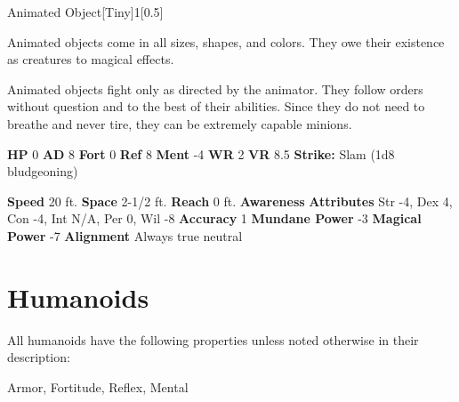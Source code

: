   
  \begin{monsection}{Animated Object}[Tiny]{1}[0.5]
    \vspace{-1em}\vspace{-1em}
    \vspace{0em}

    
    Animated objects come in all sizes, shapes, and colors. They owe their existence as creatures to magical effects.

    Animated objects fight only as directed by the animator. They follow orders without question and to the best of their abilities. Since they do not need to breathe and never tire, they can be extremely capable minions.
  
    

    \begin{spellcontent}
      \begin{spelltargetinginfo}
        \pari \textbf{HP} 0 \monsep
          \textbf{AD} 8 \monsep
          \textbf{Fort} 0 \monsep
          \textbf{Ref} 8 \monsep
          \textbf{Ment} -4
        \pari \textbf{WR} 2 \monsep
        \textbf{VR} 8.5
        \pari \textbf{Strike:}
            Slam  (1d8 bludgeoning)
      \end{spelltargetinginfo}
    \end{spellcontent}
    \begin{monsterfooter}
      \pari \textbf{Speed} 20 ft. \monsep
        \textbf{Space} 2-1/2 ft. \monsep
        \textbf{Reach} 0 ft.
      \pari \textbf{Awareness} 
      \pari \textbf{Attributes}
        Str -4, Dex 4,
        Con -4, Int N/A,
        Per 0, Wil -8
      \pari \textbf{Accuracy} 1 \monsep
        \textbf{Mundane Power} -3 \monsep
      \textbf{Magical Power} -7
      \pari \textbf{Alignment} Always true neutral
    \end{monsterfooter}
  \end{monsection}
  
  
        \section{Humanoids}

        All humanoids have the following properties unless noted otherwise in their description:
        
    
     Armor,
     Fortitude,
     Reflex,
     Mental
  
  
      

